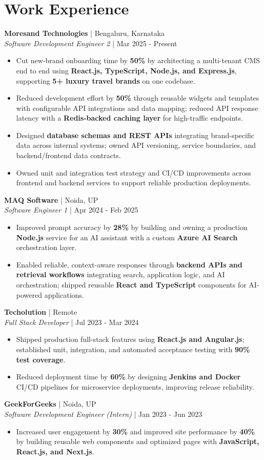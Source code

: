 \documentclass[a4paper,10pt]{article}
\newcommand{\role}[4]{\textbf{#1} | #2\\\textit{#3} | #4\par}
\begin{document}
\section{Work Experience}
\role{Moresand Technologies}{Bengaluru, Karnataka}{Software Development Engineer 2}{Mar 2025 - Present}
\begin{itemize}
\item Cut new-brand onboarding time by \textbf{50\%} by architecting a multi-tenant CMS end to end using \textbf{React.js, TypeScript, Node.js, and Express.js}, supporting \textbf{5+ luxury travel brands} on one codebase.
\item Reduced development effort by \textbf{50\%} through reusable widgets and templates with configurable API integrations and data mapping; reduced API response latency with a \textbf{Redis-backed caching layer} for high-traffic endpoints.
\item Designed \textbf{database schemas and REST APIs} integrating brand-specific data across internal systems; owned API versioning, service boundaries, and backend/frontend data contracts.
\item Owned unit and integration test strategy and CI/CD improvements across frontend and backend services to support reliable production deployments.
\end{itemize}
\role{MAQ Software}{Noida, UP}{Software Engineer 1}{Apr 2024 - Feb 2025}
\begin{itemize}
\item Improved prompt accuracy by \textbf{28\%} by building and owning a production \textbf{Node.js} service for an AI assistant with a custom \textbf{Azure AI Search} orchestration layer.
\item Enabled reliable, context-aware responses through \textbf{backend APIs and retrieval workflows} integrating search, application logic, and AI orchestration; shipped reusable \textbf{React and TypeScript} components for AI-powered applications.
\end{itemize}
\role{Techolution}{Remote}{Full Stack Developer}{Jul 2023 - Mar 2024}
\begin{itemize}
\item Shipped production full-stack features using \textbf{React.js and Angular.js}; established unit, integration, and automated acceptance testing with \textbf{90\% test coverage}.
\item Reduced deployment time by \textbf{60\%} by designing \textbf{Jenkins and Docker} CI/CD pipelines for microservice deployments, improving release reliability.
\end{itemize}
\role{GeekForGeeks}{Noida, UP}{Software Development Engineer (Intern)}{Jan 2023 - Jun 2023}
\begin{itemize}
\item Increased user engagement by \textbf{30\%} and improved site performance by \textbf{40\%} by building reusable web components and optimized pages with \textbf{JavaScript, React.js, and Next.js}.
\end{itemize}
\end{document}
